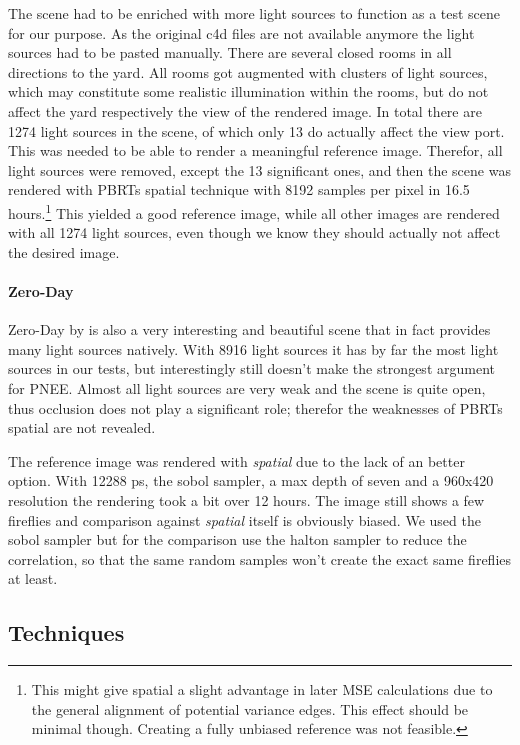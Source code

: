 The scene had to be enriched with more light sources to function as a test scene for our purpose. As the original c4d files are not available anymore the light sources had to be pasted manually. There are several closed rooms in all directions to the yard. All rooms got augmented with clusters of light sources, which may constitute some realistic illumination within the rooms, but do not affect the yard respectively the view of the rendered image. In total there are 1274 light sources in the scene, of which only 13 do actually affect the view port. This was needed to be able to render a meaningful reference image. Therefor, all light sources were removed, except the 13 significant ones, and then the scene was rendered with PBRTs spatial technique with 8192 samples per pixel in 16.5 hours.\footnote{This might give spatial a slight advantage in later MSE calculations due to the general alignment of potential variance edges. This effect should be minimal though. Creating a fully unbiased reference was not feasible.} This yielded a good reference image, while all other images are rendered with all 1274 light sources, even though we know they should actually not affect the desired image.

\paragraph{Zero-Day}

Zero-Day by \textcite{Beeple} is also a very interesting and beautiful scene that in fact provides many light sources natively. With 8916 light sources it has by far the most light sources in our tests, but interestingly still doesn't make the strongest argument for PNEE. Almost all light sources are very weak and the scene is quite open, thus occlusion does not play a significant role; therefor the weaknesses of PBRTs spatial are not revealed.

The reference image was rendered with \textit{spatial} due to the lack of an better option. With 12288 ps, the sobol sampler, a max depth of seven and a 960x420 resolution the rendering took a bit over 12 hours. The image still shows a few fireflies and comparison against \textit{spatial} itself is obviously biased. We used the sobol sampler but for the comparison use the halton sampler to reduce the correlation, so that the same random samples won't create the exact same fireflies at least.



\FloatBarrier
\subsection{Techniques}

